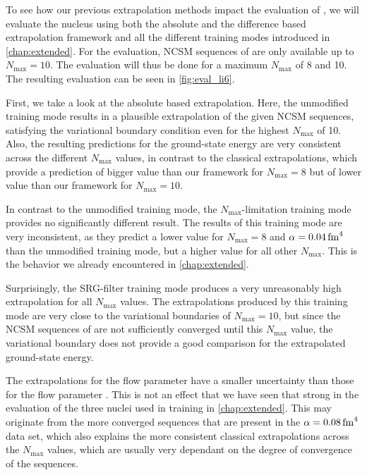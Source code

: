 To see how our previous extrapolation methods impact the evaluation of , we will evaluate the nucleus using both the absolute and the difference based extrapolation framework and all the different training modes introduced in \autoref{chap:extended}. For the evaluation, NCSM sequences of  are only available up to $N_\mathrm{max} = 10$. The evaluation will thus be done for a maximum $N_\mathrm{max}$ of 8 and 10. The resulting evaluation can be seen in \autoref{fig:eval_li6}.

First, we take a look at the absolute based extrapolation. Here, the unmodified training mode results in a plausible extrapolation of the given NCSM sequences, satisfying the variational boundary condition even for the highest $N_\mathrm{max}$ of 10. Also, the resulting predictions for the ground-state energy are very consistent across the different $N_\mathrm{max}$ values, in contrast to the classical extrapolations, which provide a prediction of bigger value than our framework for $N_\mathrm{max} = 8$ but of lower value than our framework for $N_\mathrm{max} = 10$.

In contrast to the unmodified training mode, the $N_\mathrm{max}$-limitation training mode provides no significantly different result. The results of this training mode are very inconsistent, as they predict a lower value for $N_\mathrm{max} = 8$ and $\alpha = \srg{0.04}$ than the unmodified training mode, but a higher value for all other $N_\mathrm{max}$. This is the behavior we already encountered in \autoref{chap:extended}.

Surprisingly, the SRG-filter training mode produces a very unreasonably high extrapolation for all $N_\mathrm{max}$ values. The extrapolations produced by this training mode are very close to the variational boundaries of $N_\mathrm{max} = 10$, but since the NCSM sequences of  are not sufficiently converged until this $N_\mathrm{max}$ value, the variational boundary does not provide a good comparison for the extrapolated ground-state energy.

The extrapolations for the flow parameter  have a smaller uncertainty than those for the flow parameter . This is not an effect that we have seen that strong in the evaluation of the three nuclei used in training in \autoref{chap:extended}. This may originate from the more converged sequences that are present in the $\alpha = \srg{0.08}$ data set, which also explains the more consistent classical extrapolations across the $N_\mathrm{max}$ values, which are usually very dependant on the degree of convergence of the sequences.


